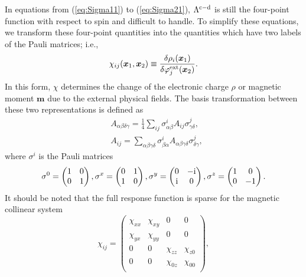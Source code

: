 %
In equations from (\ref{eq:Sigma11}) to (\ref{eq:Sigma21}), $\Lambda^{\rm c - \rm d}$ is still the
four-point function with respect to spin and difficult to handle.
To simplify these equations, we transform these four-point quantities into the quantities which have
two labels of the Pauli matrices; i.e.,
%
\begin{equation}
	\chi_{ij}(\bm x_1, \bm x_2) \equiv 
	\frac{\delta\rho_i(\bm x_1)}{\delta\varphi^{\rm ext}_{j}(\bm x_2)}.
	\label{eq:Paulichi}
\end{equation}
%
In this form, $\chi$ determines the change of the electronic charge $\rho$ or magnetic moment $\bm m$
due to the external physical fields.
The basis transformation between these two representations is defined as 
%
\begin{equation}
	\begin{split}
	& A_{\alpha\beta\delta\gamma} = \frac{1}{4}\sum_{ij}
	\sigma^{i}_{\alpha\beta}A_{ij}\sigma^{j}_{\gamma\delta}, \\
	& A_{ij} = \sum_{\alpha\beta\gamma\delta}
	\sigma^{i}_{\beta\alpha}A_{\alpha\beta\gamma\delta}\sigma^{j}_{\delta\gamma},
	\label{eq:basistrans}
\end{split}
\end{equation}
%
where $\sigma^{i}$ is the Pauli matrices
%
\begin{equation}
	\sigma^0 = 
	\begin{pmatrix}
		1 & 0 \\
		0 & 1
	\end{pmatrix},
	\sigma^x = 
	\begin{pmatrix}
		0 & 1 \\
		1 & 0
	\end{pmatrix},
	\sigma^y = 
	\begin{pmatrix}
		0 & -\rm i \\
		\rm i & 0
	\end{pmatrix},
	\sigma^z = 
	\begin{pmatrix}
		1 & 0 \\
		0 & -1
	\end{pmatrix}.
	\label{eq:Pauli}
\end{equation}
%
It should be noted that the full response function is sparse for the magnetic collinear system
%
\begin{equation}
	\chi_{ij} = 
	\begin{pmatrix}
		\chi_{xx} & \chi_{xy} & 0 & 0 \\
		\chi_{yx} & \chi_{yy} & 0 & 0 \\
		0 & 0 & \chi_{zz} & \chi_{z0} \\
		0 & 0 & \chi_{0z} & \chi_{00} \\
	\end{pmatrix},
	\label{eq:sparsechi}
\end{equation}

